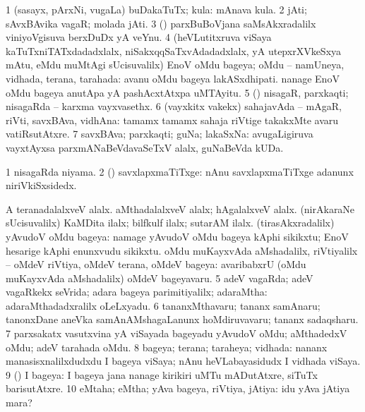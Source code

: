 \bentry
{}
\gl{\nA}
\bmng
\bnum
\num{1} (sasayx, pArxNi, \mo vugaLa) buDakaTuTx; kula:  mAnava kula. 
\num{2} jAti; sAvxBAvika vagaR;  molada jAti. 
\num{3} (\kerxY) parxBuBoVjana saMsAkxradalilx viniyoVgisuva berxDuDx yA veYnu. 
\num{4} (heVLutitxruva viSaya kaTuTxniTATxdadadxlalx, niSakxqqSaTxvAdadadxlalx, yA utepxrXVkeSxya mAtu, eMdu muMtAgi sUcisuvalilx) EnoV oMdu bageya; oMdu -- namUneya, vidhada, terana, tarahada:  avanu oMdu bageya lakASxdhipati.  nanage EnoV oMdu bageya anutApa yA pashAcxtAtxpa uMTAyitu. 
\num{5} (\pArxparx) nisagaR, parxkaqti; nisagaRda -- karxma vayxvasethx. 
\num{6} (vayxkitx \mo vakekx) sahajavAda -- mAgaR, riVti, savxBAva, vidhAna:  tamamx tamamx sahaja riVtige takakxMte avaru vatiRsutAtxre. 
\num{7} savxBAva; parxkaqti; guNa; lakaSxNa:  avugaLigiruva vayxtAyxsa parxmANaBeVdavaSeTxV alalx, guNaBeVda kUDa. 
\enum
\emng

\noindent
\gl{\pagu}
\bmng
\bnum
\num{1}  nisagaRda niyama. 
\num{2}  (\AmA) savxlapxmaTiTxge:  nAnu savxlapxmaTiTxge adanunx niriVkiSxsidedx. 
  
\banum
{} A teranadalalxveV alalx. aMthadalalxveV alalx; hAgalalxveV alalx. 
 (nirAkaraNe sUcisuvalilx) KaMDita ilalx; bilfkulf ilalx; sutarAM ilalx. 
\eanum
\numie
{}  
\banum
{} (tirasAkxradalilx) yAvudoV oMdu bageya:  namage yAvudoV oMdu bageya kAphi sikikxtu; EnoV hesarige kAphi enunxvudu sikikxtu. 
 oMdu muKayxvAda aMshadalilx, riVtiyalilx -- oMdeV riVtiya, oMdeV terana, oMdeV bageya:  avaribabxrU (oMdu muKayxvAda aMshadalilx) oMdeV bageyavaru. 
\eanum
\numie
\num{5}  adeV vagaRda; adeV vagaRkekx seVrida; adara bageya parimitiyalilx; adaraMtha:  adaraMthadadxralilx oLeLxyadu. 
\num{6}  tananxMthavaru; tananx samAnaru; tanonxDane aneVka samAnAMshagaLanunx hoMdiruvavaru; tananx sadaqsharu. 
\num{7}  parxsakatx vasutxvina yA viSayada bageyadu yAvudoV oMdu; aMthadedxV oMdu; adeV tarahada oMdu. 
\num{8}  bageya; terana; taraheya; vidhada:  nananx manasisxnalilxdudxdu I bageya viSaya; nAnu heVLabayasidudx I vidhada viSaya. 
\num{9}   (\AmA) I bageya:  I bageya jana nanage kirikiri uMTu mADutAtxre, siTuTx barisutAtxre. 
\num{10}  eMtaha; eMtha; yAva bageya, riVtiya, jAtiya:  idu yAva jAtiya mara? 
\enum
\emng

